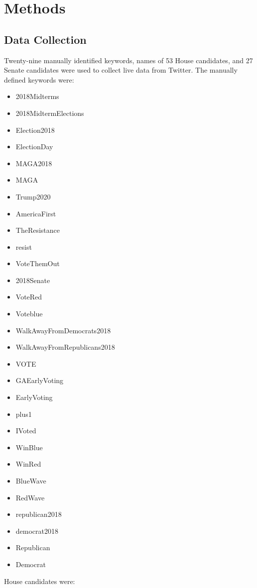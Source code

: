 \documentclass[letterpaper]{article}
\begin{document}
\section{Methods}
\label{sec:method}
\subsection{Data Collection}
Twenty-nine manually identified keywords, names of 53 House candidates, and 27 Senate candidates were used to collect live data from Twitter. The manually defined keywords were:

\begin{itemize}
    \item 2018Midterms
    \item 2018MidtermElections
    \item Election2018
    \item ElectionDay
    \item MAGA2018
    \item MAGA
    \item Trump2020
    \item AmericaFirst
    \item TheResistance
    \item resist
    \item VoteThemOut
    \item 2018Senate
    \item VoteRed
    \item Voteblue
    \item WalkAwayFromDemocrats2018
    \item WalkAwayFromRepublicans2018
    \item VOTE
    \item GAEarlyVoting
    \item EarlyVoting
    \item plus1
    \item IVoted
    \item WinBlue
    \item WinRed
    \item BlueWave
    \item RedWave
    \item republican2018
    \item democrat2018
    \item Republican
    \item Democrat
\end{itemize}

House candidates were:
\end{document}
